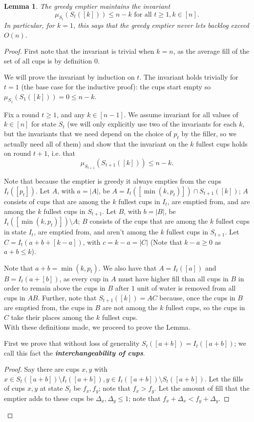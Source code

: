 \documentclass[twocolumn]{article}[10pt]
\newcommand{\defn}[1]{{\textit{\textbf{\boldmath #1}}}\xspace}
\newtheorem{lemma}{Lemma}
\begin{document}
\begin{lemma}
  The greedy emptier maintains the invariant $$\mu_{S_t}(S_t([k])) \le n-k
  \text{ for all } t\ge 1, k \in [n].$$ In particular, for $k=1$, this
  says that the greedy emptier never lets backlog exceed $O(n)$.
\end{lemma}
\begin{proof}
First note that the invariant is trivial when $k=n$, as the average fill of the
set of all cups is by definition $0$.

We will prove the invariant by induction on $t$.
The invariant holds trivially for $t=1$ (the base case for the inductive proof): 
the cups start empty so $\mu_{S_1}(S_1([k])) = 0 \le n-k$.

Fix a round $t \ge 1$, and any $k \in [n-1]$. We assume invariant for all
values of $k\in[n]$ for state $S_t$ (we will only explicitly use two of the
invariants for each $k$, but the invariants that we need depend on the
choice of $p_t$ by the filler, so we actually need all of them) and show that
the invariant on the $k$ fullest cups holds on round $t+1$, i.e. that
$$\mu_{S_{t+1}}(S_{t+1}([k])) \le n-k.$$

Note that because the emptier is greedy it always empties from the cups $I_t([p_t])$.
Let $A$, with $a=|A|$, be $A = I_t([\min(k, p_t)]) \cap S_{t+1}([k])$; $A$
consists of cups that are among the $k$ fullest cups in $I_t$, are emptied from, and
are among the $k$ fullest cups in $S_{t+1}$.
Let $B$, with $b=|B|$, be $I_t([\min(k, p_t)]) \setminus A$; $B$ consists of
the cups that are among the $k$ fullest cups in state $I_t$, are emptied from,
and aren't among the $k$ fullest cups in $S_{t+1}$. 
Let $C = I_t(a+b+[k-a])$, with $c=k-a = |C|$ (Note that $k-a\ge 0$ as $a+b \le k$). 

Note that $a+ b = \min(k, p_t)$. We also have that $A = I_t([a])$ and $B =
I_t(a+[b])$, as every cup in $A$ must have higher fill than all cups in $B$ in
order to remain above the cups in $B$ after $1$ unit of water is removed from
all cups in $AB$.
Further, note that $S_{t+1}([k]) = AC$ because, once the cups in $B$
are emptied from, the cups in $B$ are not among the $k$ fullest cups, so the
cups in $C$ take their places among the $k$ fullest cups.\\
With these definitions made, we proceed to prove the Lemma.

First we prove that without loss of generality $S_t([a+b]) = I_t([a+b])$; we
call this fact the \defn{interchangeability of cups}.
\begin{proof}
  Say there are cups $x, y$ with $x\in S_t([a+b]) \setminus I_t([a+b]), y \in
  I_t([a+b])\setminus S_t([a+b])$. Let the fills of cups $x,y$ at state $S_t$
  be $f_x, f_y$; note that $f_x > f_y$. Let the amount of fill that the emptier
  adds to these cups be $\Delta_x, \Delta_y \le 1$; note that $f_x +\Delta_x <
  f_y + \Delta_y$.


\end{proof}
\end{proof}
\end{document}
